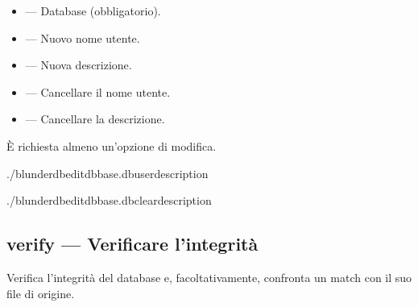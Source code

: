 \documentclass[letterpaper,10pt,italian]{sphinxmanual}
\begin{document}
\sphinxAtStartPar
{}
\begin{itemize}
\item {} 
\sphinxAtStartPar
{} — Database (obbligatorio).

\item {} 
\sphinxAtStartPar
{} — Nuovo nome utente.

\item {} 
\sphinxAtStartPar
{} — Nuova descrizione.

\item {} 
\sphinxAtStartPar
{} — Cancellare il nome utente.

\item {} 
\sphinxAtStartPar
{} — Cancellare la descrizione.

\end{itemize}

\sphinxAtStartPar
È richiesta almeno un’opzione di modifica.

\sphinxAtStartPar
{}

\begin{sphinxVerbatim}[commandchars=\\\{\}]
./blunderdbedit\PYGZhy{}\PYGZhy{}dbbase.db\PYGZhy{}\PYGZhy{}user\PYGZhy{}\PYGZhy{}description

./blunderdbedit\PYGZhy{}\PYGZhy{}dbbase.db\PYGZhy{}\PYGZhy{}clear\PYGZhy{}description
\end{sphinxVerbatim}


\subsection{verify — Verificare l’integrità}
\label{\detokenize{cli:verify-verifier-l-integrite}}
\sphinxAtStartPar
Verifica l’integrità del database e, facoltativamente, confronta un match con il suo file di origine.
\end{document}
